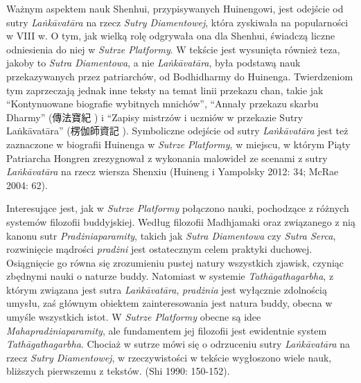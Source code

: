 Ważnym aspektem nauk Shenhui, przypisywanych Huinengowi, jest odejście od sutry \textit{La\.nkā\-vatāra} na rzecz \textit{Sutry Diamentowej}, która zyskiwała na popularności w VIII w.
O tym, jak wielką rolę odgrywała ona dla Shenhui, świadczą liczne odniesienia do niej w \textit{Sutrze Platformy}.
W tekście jest wysunięta również teza, jakoby to \textit{Sutra Diamentowa}, a nie \textit{La\.nkāvatāra}, była podstawą nauk przekazywanych przez patriarchów, od Bodhidharmy do Huinenga.
Twierdzeniom tym zaprzeczają jednak inne teksty na temat linii przekazu chan, takie jak ``Kontynuowane biografie wybitnych mnichów'', ``Annały przekazu skarbu Dharmy'' (傳法寶紀 ) i ``Zapisy mistrzów i uczniów w przekazie Sutry La\.nkāvatāra'' (楞伽師資記 ).
Symboliczne odejście od sutry \textit{La\.nkāvatāra} jest też zaznaczone w biografii Huinenga w \textit{Sutrze Platformy}, w miejscu, w którym Piąty Patriarcha Hongren zrezygnował z wykonania malowideł ze scenami z sutry \textit{La\.nkāvatāra} na rzecz wiersza Shenxiu (Huineng i Yampolsky 2012: 34; McRae 2004: 62).

Interesujące jest, jak w \textit{Sutrze Platformy} połączono nauki, pochodzące z różnych systemów filozofii buddyjskiej.
Według filozofii Madhjamaki oraz związanego z nią kanonu sutr \textit{Pradżniaparamity}, takich jak \textit{Sutra Diamentowa} czy \textit{Sutra Serca}, rozwinięcie mądrości \textit{pradżni} jest ostatecznym celem praktyki duchowej.
Osiągnięcie go równa się zrozumieniu pustej natury wszystkich zjawisk, czyniąc zbędnymi nauki o naturze buddy.
Natomiast w systemie \textit{Tathāgathagarbha}, z którym związana jest sutra \textit{La\.nkā\-vatāra}, \textit{pradżnia} jest wyłącznie zdolnością umysłu, zaś głównym obiektem zainteresowania jest natura buddy, obecna w umyśle wszystkich istot.
W \textit{Sutrze Platformy} obecne są idee \textit{Mahapradżniaparamity}, ale fundamentem jej filozofii jest ewidentnie system \textit{Tathāgathagarbha}.
Chociaż w sutrze mówi się o odrzuceniu sutry \textit{La\.nkā\-vatāra} na rzecz \textit{Sutry Diamentowej}, w rzeczywistości w tekście wygłoszono wiele nauk, bliższych pierwszemu z tekstów.
(Shi 1990: 150-152).


